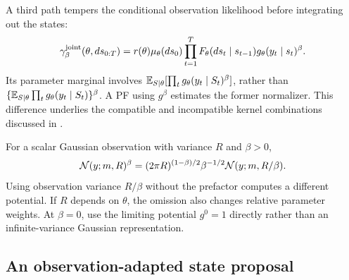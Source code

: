 A third path tempers the conditional observation likelihood before
integrating out the states:
\begin{equation}
 \gamma_\beta^{\rm joint}(\theta,ds_{0:T})
 =r(\theta)\mu_\theta(ds_0)
     \prod_{t=1}^T F_\theta(ds_t\mid s_{t-1})
                         g_\theta(y_t\mid s_t)^\beta.
 \label{eq:bf-is-smc2-joint-tempering}
\end{equation}
Its parameter marginal involves $\mathbb{E}_{S\mid\theta}
[\prod_t g_\theta(y_t\mid S_t)^\beta]$, rather than
$\{\mathbb{E}_{S\mid\theta}\prod_t g_\theta(y_t\mid S_t)\}^\beta$.
A PF using $g^\beta$ estimates the former normalizer. This difference
underlies the compatible and incompatible kernel combinations discussed
in \citet[Section 2.3]{botha2023switchingsmc2}.

For a scalar Gaussian observation with variance $R$ and $\beta>0$,
\begin{equation}
 \mathcal{N}(y;m,R)^\beta
 =(2\pi R)^{(1-\beta)/2}\beta^{-1/2}
                         \mathcal{N}(y;m,R/\beta).
 \label{eq:bf-is-smc2-gaussian-power}
\end{equation}
Using observation variance $R/\beta$ without the prefactor computes a
different potential. If $R$ depends on $\theta$, the omission also changes
relative parameter weights. At $\beta=0$, use the limiting potential
$g^0=1$ directly rather than an infinite-variance Gaussian representation.

\subsection{An observation-adapted state proposal}
\label{sec:bf-is-smc2-adapted-q20}

